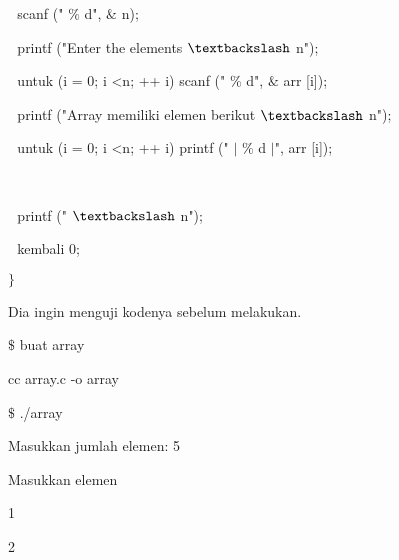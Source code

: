 \noindent 
 \hspace*{0.5in}  $  $ $  $ $  $scanf (" $  \%  $ d",  $  \&  $ n); \par
\vspace{12pt}
\noindent 
 \hspace*{0.5in}  $  $ $  $ $  $printf ("Enter the elements  $  \textbackslash  $ n"); \par
\vspace{12pt}
\noindent 
 \hspace*{0.5in}  $  $ $  $ $  $untuk (i = 0; i <n; ++ i) scanf (" $  \%  $ d",  $  \&  $ arr [i]); \par
\noindent 
 \hspace*{0.5in}  $  $ $  $ $  $printf ("Array memiliki elemen berikut  $  \textbackslash  $ n"); \par
\noindent 
 \hspace*{0.5in}  $  $ $  $ $  $untuk (i = 0; i <n; ++ i) printf (" $  \vert  $ $  \%  $ d  $  \vert  $", arr [i]); \par
\noindent 
 $  $ $  $ $  $ \par
\noindent 
 \hspace*{0.5in}  $  $ $  $ $  $printf (" $  \textbackslash  $ n"); \par
\noindent 
 \hspace*{0.5in}  $  $ $  $ $  $kembali 0; \par
\noindent 
 \hspace*{0.5in}  $  \}  $ \par
\vspace{12pt}
\vspace{12pt}
\vspace{12pt}
\vspace{12pt}
\noindent 
Dia ingin menguji kodenya sebelum melakukan. \par
\vspace{12pt}
  $  \$  $ buat array \par
\noindent 
cc array.c -o array \par
\vspace{12pt}
  $  \$  $ ./array \par
\noindent 
Masukkan jumlah elemen: 5 \par
\noindent 
Masukkan elemen \par
\noindent 
 \hspace*{0.5in} 1 \par
\noindent 
 \hspace*{0.5in} 2 \par
